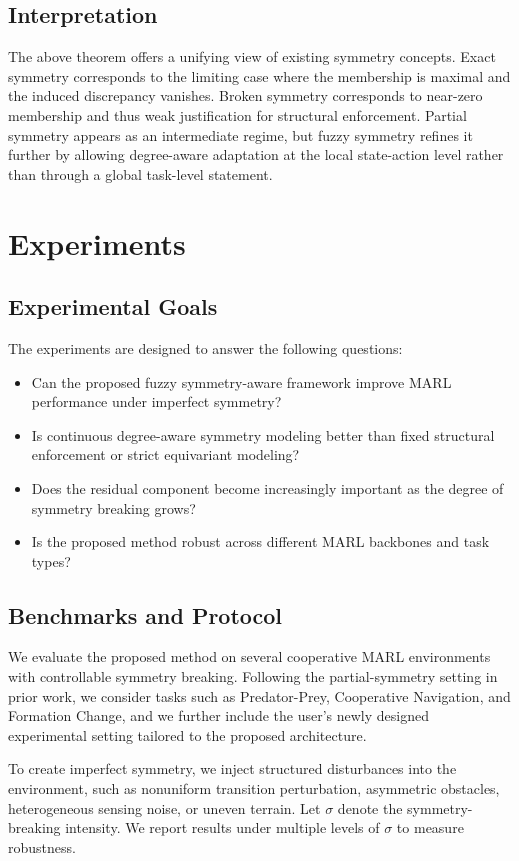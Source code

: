 \documentclass[lettersize,journal]{IEEEtran}
\begin{document}
\subsection{Interpretation}
The above theorem offers a unifying view of existing symmetry concepts. Exact symmetry corresponds to the limiting case where the membership is maximal and the induced discrepancy vanishes. Broken symmetry corresponds to near-zero membership and thus weak justification for structural enforcement. Partial symmetry appears as an intermediate regime, but fuzzy symmetry refines it further by allowing degree-aware adaptation at the local state-action level rather than through a global task-level statement.

\section{Experiments}
\subsection{Experimental Goals}
The experiments are designed to answer the following questions:
\begin{itemize}
\item Can the proposed fuzzy symmetry-aware framework improve MARL performance under imperfect symmetry?
\item Is continuous degree-aware symmetry modeling better than fixed structural enforcement or strict equivariant modeling?
\item Does the residual component become increasingly important as the degree of symmetry breaking grows?
\item Is the proposed method robust across different MARL backbones and task types?
\end{itemize}

\subsection{Benchmarks and Protocol}
We evaluate the proposed method on several cooperative MARL environments with controllable symmetry breaking. Following the partial-symmetry setting in prior work, we consider tasks such as Predator-Prey, Cooperative Navigation, and Formation Change, and we further include the user's newly designed experimental setting tailored to the proposed architecture.

To create imperfect symmetry, we inject structured disturbances into the environment, such as nonuniform transition perturbation, asymmetric obstacles, heterogeneous sensing noise, or uneven terrain. Let $\sigma$ denote the symmetry-breaking intensity. We report results under multiple levels of $\sigma$ to measure robustness.
\end{document}
